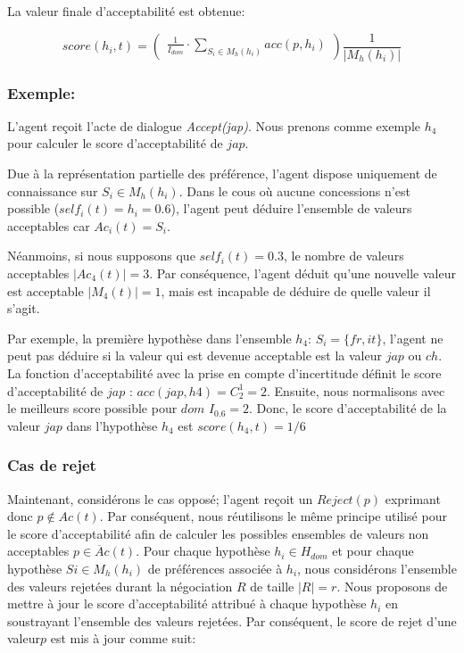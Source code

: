 La valeur finale d'acceptabilité est obtenue:

\begin{equation}
score(h_i, t)= \left( \begin{array}{c}  \frac{1}{I_{dom}} \cdot \sum_{S_i \in M_h(h_i) } acc(p, h_i) 
\end{array}\right) \frac{1}{| M_h(h_i)|}
\end{equation} 


\subsubsection{Exemple: }   
L'agent reçoit l'acte de dialogue \emph{Accept(jap)}. Nous prenons comme exemple $h_4$ pour calculer le score d'acceptabilité de $jap$.

Due à la représentation partielle des préférence, l'agent dispose uniquement de connaissance sur $S_i \in M_h(h_i)$.
Dans le cous où aucune concessions n'est possible ($self_i(t)=h_i =0.6$), l'agent peut déduire l'ensemble de valeurs acceptables car $Ac_i(t) = S_i$.

Néanmoins, si nous supposons que  $self_i(t)=0.3$, le nombre de valeurs acceptables $|Ac_4(t)| = 3$.  Par conséquence, l'agent déduit qu'une nouvelle valeur est acceptable $|M_4(t)|=1$, mais est incapable de déduire de quelle valeur il s'agit. 

Par exemple, la première hypothèse dans l'ensemble $h_4$: $S_i = \{fr, it\}$, l'agent ne peut pas déduire si la valeur qui est devenue acceptable est la valeur $jap$ ou $ch$. La fonction d'acceptabilité avec la prise en compte d'incertitude définit le score d'acceptabilité de $jap$ : 
$ acc(jap, h4) = C^1_2 = 2$. Ensuite, nous normalisons avec le meilleurs score possible pour $dom$ $I_{0.6}=2$. Donc, le score d'acceptabilité de la valeur $jap$ dans l'hypothèse $h_4$ est $score(h_4,t)= 1/6$

\subsubsection{Cas de rejet}
Maintenant, considérons le cas opposé; l'agent reçoit un $Reject(p)$ exprimant donc $p \not \in Ac(t)$. Par conséquent, nous réutilisons le même principe utilisé pour le score d'acceptabilité afin de calculer les possibles ensembles de valeurs non acceptables $ p \in \overline Ac(t)$. Pour chaque hypothèse $h_i \in H_{dom}$ et pour chaque hypothèse $Si \in M_h(h_i)$ de préférences associée à $h_i$, nous considérons l'ensemble des valeurs rejetées durant la négociation $R$ de taille $ |R| = r$. Nous proposons de mettre à jour le score d'acceptabilité attribué à chaque hypothèse $h_i$ en soustrayant l'ensemble des valeurs rejetées.
Par conséquent, le score de rejet d'une valeur$p$ est mis à jour comme suit:

